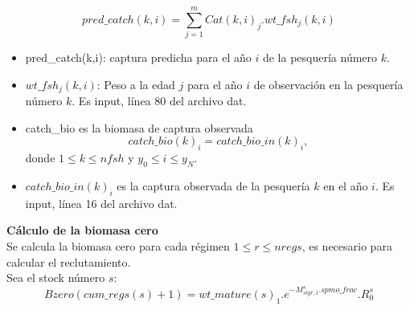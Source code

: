 \documentclass{article}
\begin{document}
\begin{itemize}
      \begin{equation}
        pred\_catch(k,i)=\sum_{j=1}^{m}Cat(k,i)_j.wt\_fsh_j(k,i)
    \end{equation}
    \begin{itemize}
        \item pred\_catch(k,i): captura predicha para el año $i$ de la pesquería número $k$.
        \item $wt\_fsh_j(k,i)$: Peso a la edad $j$ para el año $i$ de observación en la pesquería número $k$. Es input, línea 80 del archivo dat.
        \item catch\_bio es la biomasa de captura observada
        \begin{equation}
          catch\_bio(k)_i=catch\_bio\_in(k)_i,  
        \end{equation}
        donde $1\leq k \leq nfsh$ y $y_0\leq i \leq y_N$.
    \end{itemize}
    \begin{itemize}
        \item $catch\_bio\_in(k)_i$ es la captura observada de la pesquería $k$ en el año $i$. Es input, línea 16 del archivo dat. 
    \end{itemize}
\end{itemize}
\textbf{Cálculo de la biomasa cero}\\
Se calcula la biomasa cero para cada régimen $1\leq r \leq nregs$, es necesario para calcular el reclutamiento.\\
Sea el stock número $s$:
\begin{equation}
    Bzero(cum\_regs(s)+1)=wt\_mature(s)_1.e^{-M^s_{styr,1}.spmo\_frac}.R^s_0
\end{equation}
\end{document}
